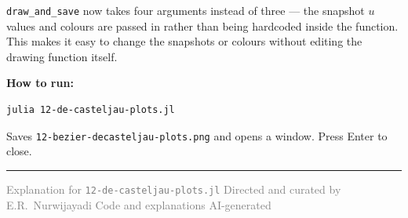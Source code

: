 \documentclass[12pt, a4paper]{article}
\newcommand{\cd}[1]{\texttt{#1}}
\begin{document}
\cd{draw\_and\_save} now takes four arguments instead of
three --- the snapshot $u$ values and colours are passed
in rather than being hardcoded inside the function.
This makes it easy to change the snapshots or colours
without editing the drawing function itself.

\begin{notebox}
\textbf{How to run:}
\begin{verbatim}
julia 12-de-casteljau-plots.jl
\end{verbatim}
Saves \cd{12-bezier-decasteljau-plots.png} and opens a window.
Press Enter to close.
\end{notebox}

\vspace{2em}\hrule\vspace{0.5em}
{\small\textcolor{gray}{%
Explanation for \texttt{12-de-casteljau-plots.jl}
\textbar{} Directed and curated by E.R.\ Nurwijayadi
\textbar{} Code and explanations AI-generated}}
\end{document}
